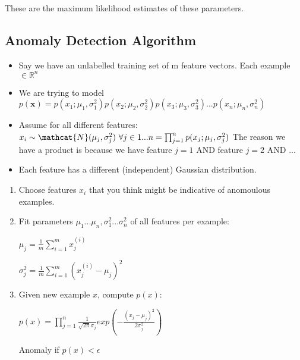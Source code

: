 \documentclass{article}
\begin{document}
These are the maximum likelihood estimates of these parameters.





\subsection{Anomaly Detection Algorithm}

\begin{itemize}
\item Say we have an unlabelled training set of m feature vectors. Each example $\in \mathbb{R}^n$



\item We are trying to model $p(\textbf{x}) = p(x_1; \mu_1, \sigma_1^2) p(x_2; \mu_2, \sigma_2^2 ) p(x_3; \mu_3, \sigma_3^2 ) ... p(x_n; \mu_n, \sigma_n^2 )$


\item Assume for all different features: $x_i \sim \mathcat{N} (\mu_j, \sigma_j^2 ) \, \, \forall j \in {1 ... n} = \prod_{j=1}^n p(x_j ; \mu_j, \sigma_j^2)$
The reason we have a product is because we have feature $j=1$ AND feature $j=2$ AND ...

\item Each feature has a different (independent) Gaussian distribution.

\end{itemize}


\begin{mybox}

\begin{enumerate}
    \item Choose features $x_i$ that you think might be indicative of anomoulous examples.
    \item Fit parameters $\mu_1 ... \mu_n, \sigma_1^2 ... \sigma_n^2$ of all features per example:
    

    $\mu_j = \frac{1}{m} \sum_{i=1}^m x_j^{(i)}$

    $\sigma_j^2 = \frac{1}{m} \sum_{i=1}^m (x_j^{(i)} - \mu_j)^2$
    
    \item Given new example $x$, compute $p(x)$:
    
    $p(x) = \prod_{j=1}^n  \frac{1}{\sqrt{2 \pi} \sigma_j} exp \left(- \frac{(x_j-\mu_j)^2}{2 \sigma_j^2} \right)$
    
    Anomaly if $p(x) < \epsilon$


\end{enumerate}


\end{mybox}
\end{document}
